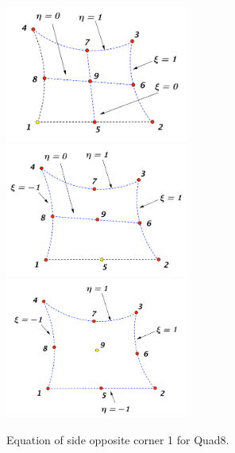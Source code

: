 \begin{figure}[h]
	\begin{center}
		\includegraphics[width=6cm,clip]{Quad8_2.pdf} 
		\includegraphics[width=6cm,clip]{Quad8_3.pdf}	
		\includegraphics[width=6cm,clip]{Quad8_4.pdf}
		\caption{Equation of side opposite corner 1 for Quad8.} \label{fig: Quad8_2}	
	\end{center} 
\end{figure}

